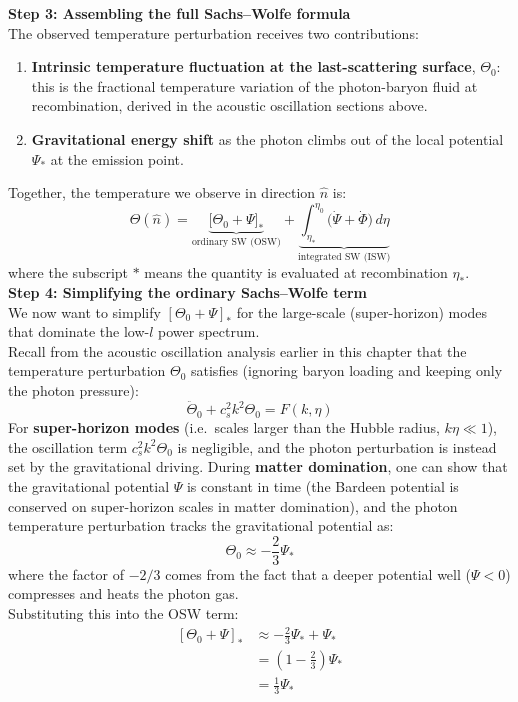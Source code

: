 \begin{foundation}
    \textbf{Step 3: Assembling the full Sachs--Wolfe formula} \\
    The observed temperature perturbation receives two contributions:
    \begin{enumerate}
        \item \textbf{Intrinsic temperature fluctuation at the last-scattering surface}, $\Theta_0$: this is the fractional temperature variation of the photon-baryon fluid at recombination, derived in the acoustic oscillation sections above.
        \item \textbf{Gravitational energy shift} as the photon climbs out of the local potential $\Psi_*$ at the emission point.
    \end{enumerate}
    Together, the temperature we observe in direction $\hat{n}$ is:
    \[
        \Theta(\hat{n}) = \underbrace{\bigl[\Theta_0 + \Psi\bigr]_{*}}_{\text{ordinary SW (OSW)}}
        + \underbrace{\int_{\eta_*}^{\eta_0}\!\bigl(\dot{\Psi}+\dot{\Phi}\bigr)\,d\eta}_{\text{integrated SW (ISW)}}
    \]
    where the subscript $*$ means the quantity is evaluated at recombination $\eta_*$. \\

    \textbf{Step 4: Simplifying the ordinary Sachs--Wolfe term} \\
    We now want to simplify $[\Theta_0 + \Psi]_*$ for the large-scale (super-horizon) modes that dominate the low-$l$ power spectrum. \\

    Recall from the acoustic oscillation analysis earlier in this chapter that the temperature perturbation $\Theta_0$ satisfies (ignoring baryon loading and keeping only the photon pressure):
    \[
        \ddot{\Theta}_0 + c_s^2 k^2 \Theta_0 = F(k, \eta)
    \]
    For \textbf{super-horizon modes} (i.e.\ scales larger than the Hubble radius, $k \eta \ll 1$), the oscillation term $c_s^2 k^2 \Theta_0$ is negligible, and the photon perturbation is instead set by the gravitational driving. During \textbf{matter domination}, one can show that the gravitational potential $\Psi$ is constant in time (the Bardeen potential is conserved on super-horizon scales in matter domination), and the photon temperature perturbation tracks the gravitational potential as:
    \[
        \Theta_0 \approx -\frac{2}{3}\Psi_*
    \]
    where the factor of $-2/3$ comes from the fact that a deeper potential well ($\Psi < 0$) compresses and heats the photon gas. \\

    Substituting this into the OSW term:
    \begin{align*}
        \left[\Theta_0 + \Psi\right]_* &\approx -\frac{2}{3}\Psi_* + \Psi_* \\
        &= \left(1 - \frac{2}{3}\right)\Psi_* \\
        &= \frac{1}{3}\Psi_*
    \end{align*}
    

\end{foundation}
